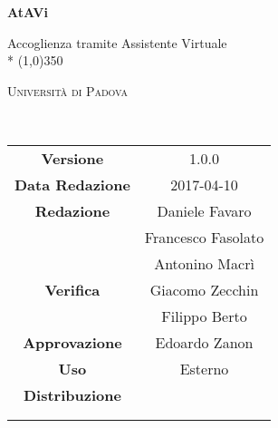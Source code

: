 \documentclass[a4paper,12pt]{article}
\date{2017/04/10}
\begin{document}
	\begin{titlepage}
		\centering
		{\huge\bfseries AtAVi\par}
		Accoglienza tramite Assistente Virtuale \\*
		\line(1,0){350} \\
		{\scshape\LARGE Università di Padova \par}
		\vspace{1cm}
		{\scshape\Large \manualeutenteRQ\ \par}
		\logo
		\newpage
		\begin{tabular}{c|c}
			{\hfill \textbf{Versione}} 			& 1.0.0			\\ 
			{\hfill\textbf{Data Redazione}} 	& 2017-04-10 		\\ 
			{\hfill\textbf{Redazione}} 			& Daniele Favaro \\ & Francesco Fasolato \\ & Antonino Macrì \\
			{\hfill\textbf{Verifica}} 			& Giacomo Zecchin \\ & Filippo Berto \\ 
			{\hfill\textbf{Approvazione}} 		& Edoardo Zanon \\
			{\hfill\textbf{Uso}} 				& Esterno 			\\
			{\hfill\textbf{Distribuzione}} 		& \vardanega \\ & \cardin \\ & \prop \\
		\end{tabular}
	\end{titlepage}
	
	\pagestyle{myfront}
	\newpage	
			

	\newpage
		\tableofcontents 	%
	\newpage
		\listoftables 		%
	\newpage	
		\listoffigures		%
	
	\label{LastFrontPage}
		\newpage
		\pagestyle{mymain}
		
		\newpage
		
		\newpage
		
		\newpage
		
		\newpage
		
		\newpage
		
	\label{LastPage}
\end{document}
